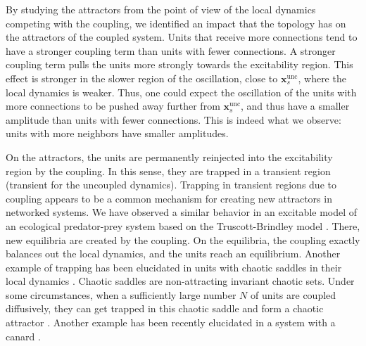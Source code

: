 By studying the attractors from the point of view of the local dynamics competing with the coupling, we identified an impact that the topology has on the attractors of the coupled system. Units that receive more connections tend to have a stronger coupling term than units with fewer connections. A stronger coupling term pulls the units more strongly towards the excitability region. This effect is stronger in the slower region of the oscillation, close to $\mathbf{x}_s^\mathrm{unc}$, where the local dynamics is weaker. Thus, one could expect the oscillation of the units with more connections to be pushed away further from $\mathbf{x}_s^\mathrm{unc}$, and thus have a smaller amplitude than units with fewer connections. This is indeed what we observe: units with more neighbors have smaller amplitudes.

On the attractors, the units are permanently reinjected into the excitability region by the coupling. In this sense, they are trapped in a transient region (transient for the uncoupled dynamics). Trapping in transient regions due to coupling appears to be a common mechanism for creating new attractors in networked systems. We have observed a similar behavior in an excitable model of an ecological predator-prey system based on the Truscott-Brindley model \cite{truscott1984ocean}. There, new equilibria are created by the coupling. On the equilibria, the coupling exactly balances out the local dynamics, and the units reach an equilibrium. Another example of trapping has been elucidated in units with chaotic saddles in their local dynamics \cite{medeiros2018boundaries, medeiros2019state, medeiros2021the}. Chaotic saddles are non-attracting invariant chaotic sets. Under some circumstances, when a sufficiently large number $N$ of units are coupled diffusively, they can get trapped in this chaotic saddle and form a chaotic attractor \cite{medeiros2018boundaries, medeiros2019state}.  Another example has been recently elucidated in a system with a canard \cite{contreras2023scale}. 

